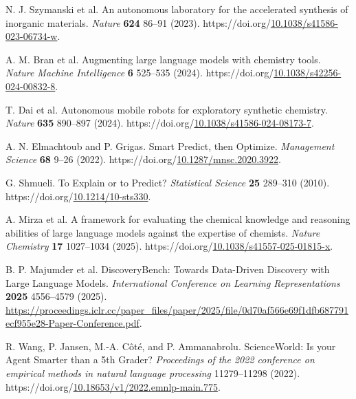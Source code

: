 \documentclass[12pt,a4paper]{article}
\newlength{\csllabelwidth}\setlength{\csllabelwidth}{2em}
\newenvironment{CSLReferences}[2]{\small\setlength{\parindent}{0pt}\setlength{\parskip}{4pt}}{\par}
\newcommand{\CSLLeftMargin}[1]{\par\noindent\makebox[\csllabelwidth][l]{#1}}
\newcommand{\CSLRightInline}[1]{\parbox[t]{\dimexpr\linewidth-\csllabelwidth\relax}{#1}\par}
\begin{document}
\begin{CSLReferences}{0}{1}
\hypertarget{ref-szymanski2023alab}{}
\CSLLeftMargin{9. }%
\CSLRightInline{{N. J. Szymanski et al.} An autonomous laboratory for the accelerated synthesis of inorganic materials. \emph{Nature} \textbf{624} 86--91 (2023). https://doi.org/\href{https://doi.org/10.1038/s41586-023-06734-w}{10.1038/s41586-023-06734-w}.}

\hypertarget{ref-bran2024augmenting}{}
\CSLLeftMargin{10. }%
\CSLRightInline{A. M. Bran et al. Augmenting large language models with chemistry tools. \emph{Nature Machine Intelligence} \textbf{6} 525--535 (2024). https://doi.org/\href{https://doi.org/10.1038/s42256-024-00832-8}{10.1038/s42256-024-00832-8}.}

\hypertarget{ref-dai2024mobile}{}
\CSLLeftMargin{11. }%
\CSLRightInline{T. Dai et al. {Autonomous mobile robots for exploratory synthetic chemistry}. \emph{Nature} \textbf{635} 890--897 (2024). https://doi.org/\href{https://doi.org/10.1038/s41586-024-08173-7}{10.1038/s41586-024-08173-7}.}

\hypertarget{ref-elmachtoub2022spo}{}
\CSLLeftMargin{12. }%
\CSLRightInline{A. N. Elmachtoub and P. Grigas. Smart {Predict, then Optimize}. \emph{Management Science} \textbf{68} 9--26 (2022). https://doi.org/\href{https://doi.org/10.1287/mnsc.2020.3922}{10.1287/mnsc.2020.3922}.}

\hypertarget{ref-shmueli2010explain}{}
\CSLLeftMargin{13. }%
\CSLRightInline{G. Shmueli. {To Explain or to Predict?} \emph{Statistical Science} \textbf{25} 289--310 (2010). https://doi.org/\href{https://doi.org/10.1214/10-sts330}{10.1214/10-sts330}.}

\hypertarget{ref-mirza2025chembench}{}
\CSLLeftMargin{14. }%
\CSLRightInline{A. Mirza et al. {A framework for evaluating the chemical knowledge and reasoning abilities of large language models against the expertise of chemists}. \emph{Nature Chemistry} \textbf{17} 1027--1034 (2025). https://doi.org/\href{https://doi.org/10.1038/s41557-025-01815-x}{10.1038/s41557-025-01815-x}.}

\hypertarget{ref-majumder2025discoverybench}{}
\CSLLeftMargin{15. }%
\CSLRightInline{B. P. Majumder et al. {DiscoveryBench: Towards Data-Driven Discovery with Large Language Models}. \emph{{International Conference on Learning Representations}} \textbf{2025} 4556--4579 (2025). \url{https://proceedings.iclr.cc/paper_files/paper/2025/file/0d70af566e69f1dfb687791ecf955e28-Paper-Conference.pdf}.}

\hypertarget{ref-wang2022scienceworld}{}
\CSLLeftMargin{16. }%
\CSLRightInline{R. Wang, P. Jansen, M.-A. Côté, and P. Ammanabrolu. {ScienceWorld: Is your Agent Smarter than a 5th Grader?} \emph{Proceedings of the 2022 conference on empirical methods in natural language processing} 11279--11298 (2022). https://doi.org/\href{https://doi.org/10.18653/v1/2022.emnlp-main.775}{10.18653/v1/2022.emnlp-main.775}.}


\end{CSLReferences}
\end{document}
